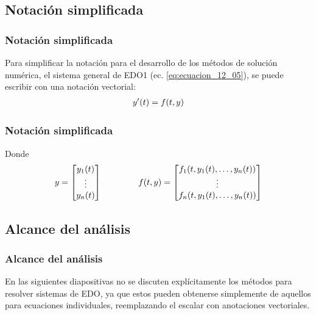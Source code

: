 \subsection*{Notación simplificada}
\begin{frame}
\frametitle{Notación simplificada}
Para simplificar la notación para el desarrollo de los métodos de solución numérica, el sistema general de EDO1 (ec. \ref{eq:ecuacion_12_05}), se puede escribir con una notación vectorial:
\begin{align}
{y}^{\prime} (t) = f (t, y)
\label{eq:ecuacion_12_06}
\end{align}
\end{frame}
\begin{frame}
\frametitle{Notación simplificada}
Donde
\begin{align*}
y = \begin{bmatrix}
y_{1} (t) \\
\vdots \\
y_{n} (t)
\end{bmatrix}
\hspace{1.5cm}
f(t, y) =
\begin{bmatrix}
f_{1} (t, y_{1} (t), \ldots, y_{n} (t)) \\
\vdots \\
f_{n} (t, y_{1} (t), \ldots, y_{n} (t))
\end{bmatrix}
\end{align*}
\end{frame}
\begin{frame}
\subsection*{Alcance del análisis}
\frametitle{Alcance del análisis}
En las siguientes diapositivas no se discuten explícitamente los métodos para resolver sistemas de EDO, ya que estos pueden obtenerse simplemente de aquellos para ecuaciones individuales, reemplazando el escalar con anotaciones vectoriales.
\end{frame}
